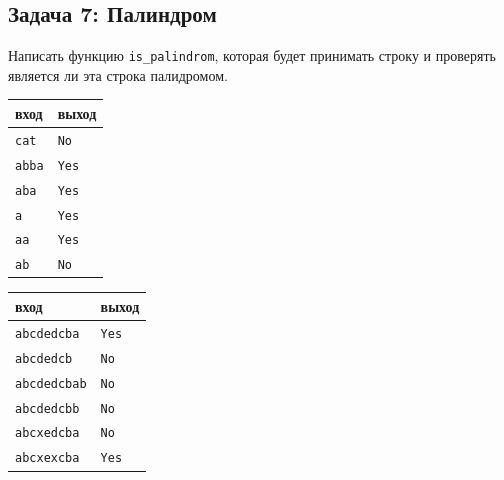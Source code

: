 \documentclass{article}
\begin{document}
\subsection*{Задача 7: Палиндром}
Написать функцию \texttt{is\_palindrom}, которая будет принимать строку и проверять является ли эта строка палидромом.

\begin{multicols}{2}
\begin{center}
\begin{tabular}{ l | l }
 вход & выход \\ \hline
 \texttt{cat} & \texttt{No} \\
 \texttt{abba} & \texttt{Yes} \\
 \texttt{aba} & \texttt{Yes} \\
 \texttt{a} & \texttt{Yes} \\
 \texttt{aa} & \texttt{Yes} \\
 \texttt{ab} & \texttt{No} 
\end{tabular}
\end{center}


\begin{center}
\begin{tabular}{ l | l }
 вход & выход \\ \hline
 \texttt{abcdedcba} & \texttt{Yes} \\
 \texttt{abcdedcb} & \texttt{No} \\
 \texttt{abcdedcbab} & \texttt{No} \\
 \texttt{abcdedcbb} & \texttt{No} \\
 \texttt{abcxedcba} & \texttt{No} \\
 \texttt{abcxexcba} & \texttt{Yes} 
\end{tabular}
\end{center}
\end{multicols}
\end{document}
